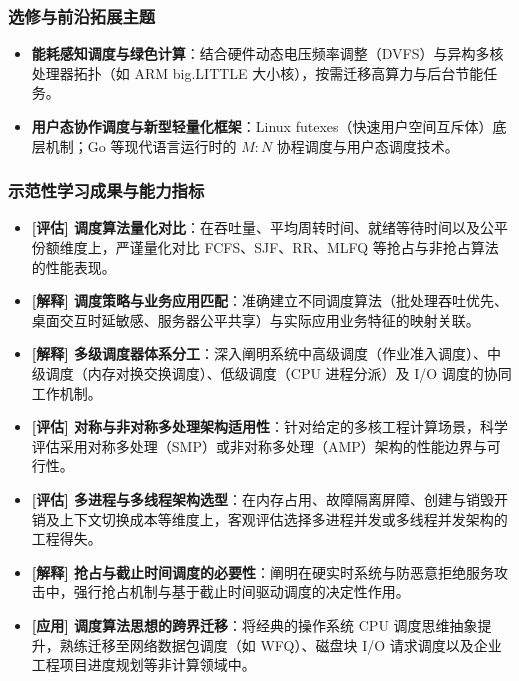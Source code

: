 \subsubsection{选修与前沿拓展主题}
\begin{itemize}\setlength{\itemsep}{0pt}\setlength{\parskip}{0pt}
    \item \textbf{能耗感知调度与绿色计算}：结合硬件动态电压频率调整（DVFS）与异构多核处理器拓扑（如 ARM big.LITTLE 大小核），按需迁移高算力与后台节能任务。
    \item \textbf{用户态协作调度与新型轻量化框架}：Linux futexes（快速用户空间互斥体）底层机制；Go 等现代语言运行时的 $M:N$ 协程调度与用户态调度技术。
\end{itemize}

\subsubsection{示范性学习成果与能力指标}
\begin{itemize}\setlength{\itemsep}{0pt}\setlength{\parskip}{0pt}
    \item \textbf{[评估] 调度算法量化对比}：在吞吐量、平均周转时间、就绪等待时间以及公平份额维度上，严谨量化对比 FCFS、SJF、RR、MLFQ 等抢占与非抢占算法的性能表现。
    \item \textbf{[解释] 调度策略与业务应用匹配}：准确建立不同调度算法（批处理吞吐优先、桌面交互时延敏感、服务器公平共享）与实际应用业务特征的映射关联。
    \item \textbf{[解释] 多级调度器体系分工}：深入阐明系统中高级调度（作业准入调度）、中级调度（内存对换交换调度）、低级调度（CPU 进程分派）及 I/O 调度的协同工作机制。
    \item \textbf{[评估] 对称与非对称多处理架构适用性}：针对给定的多核工程计算场景，科学评估采用对称多处理（SMP）或非对称多处理（AMP）架构的性能边界与可行性。
    \item \textbf{[评估] 多进程与多线程架构选型}：在内存占用、故障隔离屏障、创建与销毁开销及上下文切换成本等维度上，客观评估选择多进程并发或多线程并发架构的工程得失。
    \item \textbf{[解释] 抢占与截止时间调度的必要性}：阐明在硬实时系统与防恶意拒绝服务攻击中，强行抢占机制与基于截止时间驱动调度的决定性作用。
    \item \textbf{[应用] 调度算法思想的跨界迁移}：将经典的操作系统 CPU 调度思维抽象提升，熟练迁移至网络数据包调度（如 WFQ）、磁盘块 I/O 请求调度以及企业工程项目进度规划等非计算领域中。
\end{itemize}

